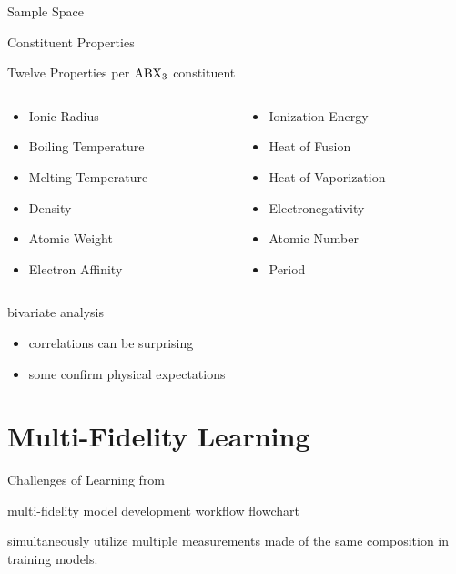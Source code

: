 \documentclass[10pt, aspectratio=169, presentation]{beamer}
\begin{document}
\begin{frame}[label={sec:org991223b}]{Sample Space}
\end{frame}

\begin{frame}[label={sec:org2e55e52}]{Constituent Properties}
\begin{block}{Twelve Properties per \(\ce{ABX_3}\) constituent}
\begin{columns}
\begin{column}{0.5\columnwidth}
\begin{itemize}
\item Ionic Radius
\item Boiling Temperature
\item Melting Temperature
\item Density
\item Atomic Weight
\item Electron Affinity
\end{itemize}
\end{column}
\begin{column}{0.5\columnwidth}
\begin{itemize}
\item Ionization Energy
\item Heat of Fusion
\item Heat of Vaporization
\item Electronegativity
\item Atomic Number
\item Period
\end{itemize}
\end{column}
\end{columns}
\end{block}
\end{frame}

\begin{frame}[label={sec:org3f2baf5}]{bivariate analysis}
\begin{itemize}
\item correlations can be surprising
\item some confirm physical expectations
\end{itemize}
\end{frame}

\section{Multi-Fidelity Learning}
\label{sec:org6599713}
\begin{frame}[label={sec:org19c5349}]{Challenges of Learning from}
\end{frame}
\begin{frame}[label={sec:org8196b23}]{multi-fidelity model development workflow}
\alert{flowchart}

simultaneously utilize multiple measurements made of the same
composition in training models.\autocite{manganaris-2022-mrs-comput}
\end{frame}
\end{document}
